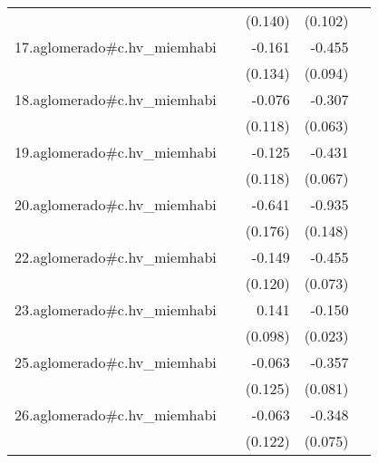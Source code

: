 {\begin{longtable}{l*{4}{D{.}{.}{-1}}}
            &                     &     (0.140)         &     (0.102)         &                     \\
\addlinespace
17.aglomerado#c.hv\_miemhabi&                     &      -0.161         &      -0.455\sym{***}&                     \\
            &                     &     (0.134)         &     (0.094)         &                     \\
\addlinespace
18.aglomerado#c.hv\_miemhabi&                     &      -0.076         &      -0.307\sym{***}&                     \\
            &                     &     (0.118)         &     (0.063)         &                     \\
\addlinespace
19.aglomerado#c.hv\_miemhabi&                     &      -0.125         &      -0.431\sym{***}&                     \\
            &                     &     (0.118)         &     (0.067)         &                     \\
\addlinespace
20.aglomerado#c.hv\_miemhabi&                     &      -0.641\sym{***}&      -0.935\sym{***}&                     \\
            &                     &     (0.176)         &     (0.148)         &                     \\
\addlinespace
22.aglomerado#c.hv\_miemhabi&                     &      -0.149         &      -0.455\sym{***}&                     \\
            &                     &     (0.120)         &     (0.073)         &                     \\
\addlinespace
23.aglomerado#c.hv\_miemhabi&                     &       0.141         &      -0.150\sym{***}&                     \\
            &                     &     (0.098)         &     (0.023)         &                     \\
\addlinespace
25.aglomerado#c.hv\_miemhabi&                     &      -0.063         &      -0.357\sym{***}&                     \\
            &                     &     (0.125)         &     (0.081)         &                     \\
\addlinespace
26.aglomerado#c.hv\_miemhabi&                     &      -0.063         &      -0.348\sym{***}&                     \\
            &                     &     (0.122)         &     (0.075)         &                     \\

\end{longtable}}
